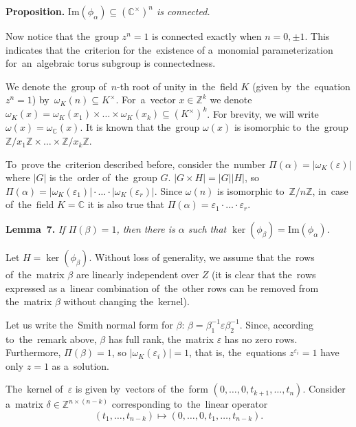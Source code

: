 \documentclass[twoside]{article}
\begin{document}
\medskip\noindent\textbf{Proposition.}\emph{
    $\mathrm{Im}(\phi_\alpha) \subseteq (\mathbb{C}^\times)^n$ is connected.
}\medskip

Now notice that the~group $z^n = 1$ is connected exactly when $n = 0, \pm 1$.
This indicates that the~criterion for the~existence of a~monomial parameterization
for~an~algebraic torus subgroup is connectedness.

We denote the~group of~$n$-th root of unity in~the~field $K$ (given by~the~equation $z^n = 1$) by~$\omega_K(n) \subseteq K^\times$.
For~a~vector $x \in \mathbb{Z}^k$ we denote $\omega_K(x) = \omega_K(x_1) \times \ldots \times \omega_K(x_k) \subseteq (K^\times)^k$.
For brevity, we will write $\omega(x) = \omega_\mathbb{C}(x)$. It is known that the~group $\omega(x)$ is isomorphic
to~the~group $\mathbb{Z} / x_1 \mathbb{Z} \times \ldots \times \mathbb{Z} / x_k \mathbb{Z}$.

To~prove the~criterion described before, consider the~number $\Pi(\alpha) = |\omega_K(\varepsilon)|$
where $|G|$ is the~order of~the~group $G$. $|G \times H| = |G| |H|$, so $\Pi(\alpha) = |\omega_K(\varepsilon_1)| \cdot \ldots \cdot |\omega_K(\varepsilon_r)|$.
Since $\omega(n)$ is isomorphic to~$\mathbb{Z} / n \mathbb{Z}$, in~case of~the~field $K = \mathbb{C}$ it is also true that
$\Pi(\alpha) = \varepsilon_1 \cdot \ldots \cdot \varepsilon_r$.

\medskip\noindent\textbf{Lemma~7.}\emph{
    If $\Pi(\beta) = 1$, then there is $\alpha$ such that $\ker(\phi_\beta) = \mathrm{Im}(\phi_\alpha)$.
}\medskip

    Let $H = \ker(\phi_\beta)$. Without loss of generality, we assume that the~rows of~the~matrix $\beta$ are linearly independent
    over $Z$ (it is clear that the~rows expressed as a~linear combination of~the~other rows can be removed from the~matrix $\beta$
    without changing the~kernel).

    Let us write the~Smith normal form for $\beta$: $\beta = \beta_1^{-1} \varepsilon \beta_2^{-1}$.
    Since, according to~the~remark above, $\beta$ has full rank, the~matrix $\varepsilon$ has no zero rows.
    Furthermore, $\Pi(\beta) = 1$, so $|\omega_K(\varepsilon_i)| = 1$, that is, the~equations $z^{\varepsilon_i} = 1$
    have only $z = 1$ as a~solution.

    The~kernel of~$\varepsilon$ is given by~vectors of~the~form $(0,\allowbreak \ldots,\allowbreak 0,\allowbreak t_{k + 1},\allowbreak \ldots, t_{n})$.
    Consider a~matrix $\delta \in \mathbb{Z}^{n \times (n - k)}$ corresponding to~the~linear operator
    $$
        (t_1, \ldots, t_{n - k}) \mapsto (0, \ldots, 0, t_1, \ldots, t_{n - k}).
    $$
\end{document}
